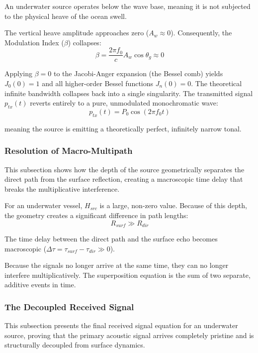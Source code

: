 \documentclass{article}
\begin{document}
An underwater source operates below the wave base, meaning it is not subjected to the physical heave of the ocean swell.

The vertical heave amplitude approaches zero ($A_w \approx 0$).
Consequently, the Modulation Index ($\beta$) collapses:
\begin{equation}
\beta = \frac{2\pi f_0}{c} A_w \cos\theta_g \approx 0
\end{equation}

Applying $\beta = 0$ to the Jacobi-Anger expansion (the Bessel comb) yields $J_0(0) = 1$ and all higher-order Bessel functions $J_n(0) = 0$. The theoretical infinite bandwidth collapses back into a single singularity. The transmitted signal $p_{tx}(t)$ reverts entirely to a pure, unmodulated monochromatic wave:
\begin{equation}
p_{tx}(t) = P_0 \cos(2\pi f_0 t)
\end{equation}

meaning the source is emitting a theoretically perfect, infinitely narrow tonal.

\subsubsection{Resolution of Macro-Multipath}
This subsection shows how the depth of the source geometrically separates the direct path from the surface reflection, creating a macroscopic time delay that breaks the multiplicative interference.

For an underwater vessel, $H_{src}$ is a large, non-zero value. 
Because of this depth, the geometry creates a significant difference in path lengths:
\begin{equation}
R_{surf} \gg R_{dir}
\end{equation}

The time delay between the direct path and the surface echo becomes macroscopic ($\Delta \tau = \tau_{surf} - \tau_{dir} \gg 0$).

Because the signals no longer arrive at the same time, they can no longer interfere multiplicatively. 
The superposition equation is the sum of two separate, additive events in time.

\subsubsection{The Decoupled Received Signal}
This subsection presents the final received signal equation for an underwater source, proving that the primary acoustic signal arrives completely pristine and is structurally decoupled from surface dynamics.
\end{document}
